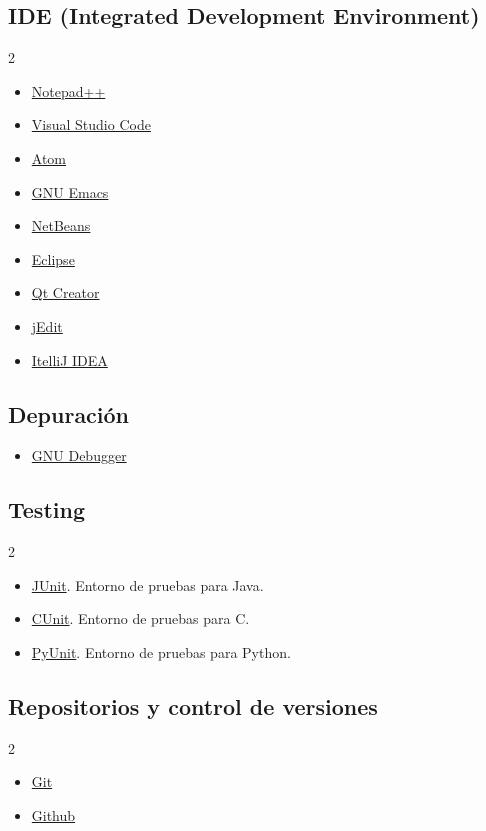 \subsection{IDE (Integrated Development Environment)}
\begin{multicols}{2}
\begin{itemize}[nosep]
\item \href{https://notepad-plus-plus.org/}{Notepad++}
\item \href{https://code.visualstudio.com/}{Visual Studio Code}
\item \href{https://atom.io/}{Atom}
\item \href{https://www.gnu.org/s/emacs/}{GNU Emacs}
\item \href{https://netbeans.org/}{NetBeans}
\item \href{https://eclipse.org/}{Eclipse}
\item \href{https://www.qt.io/ide/}{Qt Creator}
\item \href{http://www.jedit.org/}{jEdit}
\item \href{https://www.jetbrains.com/idea/}{ItelliJ IDEA}
\end{itemize}
\end{multicols}



\subsection{Depuración}
\begin{itemize}[nosep]
\item \href{https://www.gnu.org/s/gdb/}{GNU Debugger}
\end{itemize}


\subsection{Testing}
\begin{multicols}{2}
\begin{itemize}[nosep]
\item \href{http://junit.org}{JUnit}. Entorno de pruebas para Java.
\item \href{http://cunit.sourceforge.net/}{CUnit}. Entorno de pruebas para C.
\item \href{https://wiki.python.org/moin/PyUnit}{PyUnit}. Entorno de pruebas para Python.
\end{itemize}
\end{multicols}

\subsection{Repositorios y control de versiones}
\begin{multicols}{2}
\begin{itemize}[nosep]
\item \href{https://git-scm.com/}{Git}
\item \href{https://github.com/}{Github}

\end{itemize}
\end{multicols}

